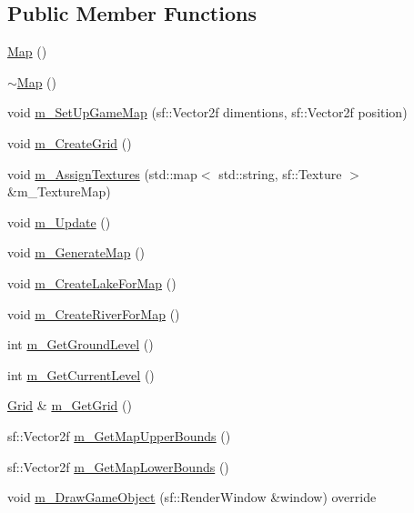 \subsection*{Public Member Functions}
\begin{DoxyCompactItemize}
\item 
\mbox{\hyperlink{class_map_a0f5ad0fd4563497b4214038cbca8b582}{Map}} ()
\item 
\mbox{\hyperlink{class_map_aa403fbe09394ccf39747588f5168e3b2}{$\sim$\+Map}} ()
\item 
void \mbox{\hyperlink{class_map_a0f3b846f14a87030cf53d6fd32072cda}{m\+\_\+\+Set\+Up\+Game\+Map}} (sf\+::\+Vector2f dimentions, sf\+::\+Vector2f position)
\item 
void \mbox{\hyperlink{class_map_a2cc424825baa72efdc7ceb1580eabf3a}{m\+\_\+\+Create\+Grid}} ()
\item 
void \mbox{\hyperlink{class_map_a31635a85e9b5d86369ff0765d03dff93}{m\+\_\+\+Assign\+Textures}} (std\+::map$<$ std\+::string, sf\+::\+Texture $>$ \&m\+\_\+\+Texture\+Map)
\item 
void \mbox{\hyperlink{class_map_a50d9a80e029be4f056b8c5d73791b6c4}{m\+\_\+\+Update}} ()
\item 
void \mbox{\hyperlink{class_map_a44b30d85da0d39adb6b144af1ae98616}{m\+\_\+\+Generate\+Map}} ()
\item 
void \mbox{\hyperlink{class_map_a8d88a513b07b30ebd5e0a94ad6537e8b}{m\+\_\+\+Create\+Lake\+For\+Map}} ()
\item 
void \mbox{\hyperlink{class_map_a0fbb42a352131e4815bef949fdcd36d3}{m\+\_\+\+Create\+River\+For\+Map}} ()
\item 
int \mbox{\hyperlink{class_map_a91a657dd319b8fcec0c9ef17702cf2a2}{m\+\_\+\+Get\+Ground\+Level}} ()
\item 
int \mbox{\hyperlink{class_map_a2dd8826757e273671fc952dcd7c9c6b1}{m\+\_\+\+Get\+Current\+Level}} ()
\item 
\mbox{\hyperlink{class_grid}{Grid}} \& \mbox{\hyperlink{class_map_a50cc8967bbc1feed965946bf308e2401}{m\+\_\+\+Get\+Grid}} ()
\item 
sf\+::\+Vector2f \mbox{\hyperlink{class_map_ac8d0317e330bef1da2c965bd24f64412}{m\+\_\+\+Get\+Map\+Upper\+Bounds}} ()
\item 
sf\+::\+Vector2f \mbox{\hyperlink{class_map_adf5933cab79aee80497d72d87a169f62}{m\+\_\+\+Get\+Map\+Lower\+Bounds}} ()
\item 
void \mbox{\hyperlink{class_map_aa65945c61f28808b549a264a3b87219e}{m\+\_\+\+Draw\+Game\+Object}} (sf\+::\+Render\+Window \&window) override

\end{DoxyCompactItemize}
